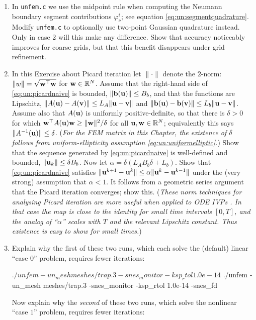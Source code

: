 \begin{enumerate}
\item \label{exer:un:gaussneumann}  In \texttt{unfem.c} we use the midpoint rule when computing the Neumann boundary segment contributions $\varphi_\nu^i$; see equation \eqref{eq:un:segmentquadrature}.  Modify \texttt{unfem.c} to optionally use two-point Gaussian quadrature instead.  Only in case 2 will this make any difference.  Show that accuracy noticeably improves for coarse grids, but that this benefit disappears under grid refinement.
\item \label{exer:un:picardconvergence}  In this Exercise about Picard iteration let $\|\cdot\|$ denote the $2$-norm: $\|w\| = \sqrt{\mathbf{w}^\top \mathbf{w}}$ for $\mathbf{w}\in\mathbb{R}^N$.  Assume that the right-hand side of \eqref{eq:un:picardnaive} is bounded, $\|\mathbf{b}(\mathbf{u})\| \le B_b$, and that the functions are Lipschitz, $\|A(\mathbf{u})-A(\mathbf{v})\| \le L_A \|\mathbf{u}-\mathbf{v}\|$ and $\|\mathbf{b}(\mathbf{u})-\mathbf{b}(\mathbf{v})\| \le L_b \|\mathbf{u}-\mathbf{v}\|$.  Assume also that $A(\mathbf{u})$ is uniformly positive-definite, so that there is $\delta>0$ for which $\mathbf{w}^\top A(\mathbf{u}) \mathbf{w} \ge \|\mathbf{w}\|^2/\delta$ for all $\mathbf{u}, \mathbf{w} \in \mathbb{R}^N$; equivalently this says $\|A^{-1}(\mathbf{u})\| \le \delta$.  (\emph{For the FEM matrix in this Chapter, the existence of $\delta$ follows from uniform-ellipticity assumption \eqref{eq:un:uniformelliptic}.})  Show that the sequence generated by \eqref{eq:un:picardnaive} is well-defined and bounded, $\|\mathbf{u}_k\| \le \delta B_b$.  Now let $\alpha = \delta \left(L_A B_b \delta + L_b\right)$.  Show that \eqref{eq:un:picardnaive} satisfies $\|\mathbf{u}^{k+1}-\mathbf{u}^{k}\| \le \alpha \|\mathbf{u}^{k}-\mathbf{u}^{k-1}\|$ under the (very strong) assumption that $\alpha < 1$.  It follows from a geometric series argument that the Picard iteration converges; show this.  (\emph{These norm techniques for analysing Picard iteration are more useful when applied to ODE IVPs \citep{HirschSmaleDevaney2004}.  In that case the map is close to the identity for small time intervals $[0,T]$, and the analog of ``$\alpha$'' scales with $T$ and the relevant Lipschitz constant.  Thus existence is easy to show for small times.})
\item Explain why the first of these two runs, which each solve the (default) linear ``case $0$'' problem, requires fewer \pSNES iterations:
\begin{cline}
$ ./unfem -un_mesh meshes/trap.3 -snes_monitor -ksp_rtol 1.0e-14
$ ./unfem -un_mesh meshes/trap.3 -snes_monitor -ksp_rtol 1.0e-14 -snes_fd
\end{cline}
Now explain why the \emph{second} of these two runs, which solve the nonlinear ``case $1$'' problem, requires fewer \pSNES iterations:

\end{enumerate}
